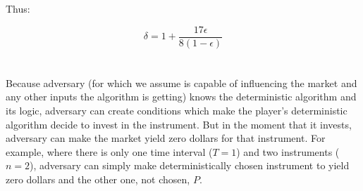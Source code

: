 \documentclass[a4paper,11pt,oneside,onecolumn]{article}
\begin{document}
Thus:

$$
\delta = 1 + \frac{17 \epsilon }{8 (1-\epsilon) }
$$

\section{}

\subsection{}

Because adversary (for which we assume is capable of influencing the market and any other inputs the algorithm is getting)
knows the deterministic algorithm and its logic, adversary can create conditions which make the player's
deterministic algorithm decide to invest in the instrument. But in the moment that it invests, adversary can make the market
yield zero dollars for that instrument. For example, where there is only one time interval ($T=1$) and two instruments ($n=2$), adversary can
simply make deterministically chosen instrument to yield zero dollars and the other one, not chosen, $P$.
\end{document}
